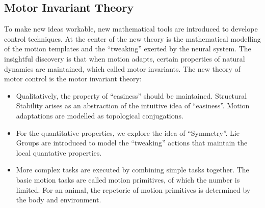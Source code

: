 \subsection{Motor Invariant Theory}
%
%
%
To make new ideas workable, new mathematical tools are introduced to develope control techniques.
At the center of the new theory is the mathematical modelling of the motion templates and the ``tweaking'' exerted by the neural system.
The insightful discovery is that when motion adapts, certain properties of natural dynamics are maintained, which called motor invariants.
The new theory of motor control is the motor invariant theory:
\begin{itemize}

\item Qualitatively, the property of ``easiness'' should be maintained.
Structural Stability arises as an abstraction of the intuitive idea of ``easiness''.
Motion adaptations are modelled as topological conjugations. 

\item For the quantitative properties, we explore the idea of ``Symmetry''.
Lie Groups are introduced to model the ``tweaking'' actions that maintain the local quantative properties.


\item More complex tasks are executed by combining simple tasks together.
The basic motion tasks are called motion primitives, of which the number is limited.
For an animal, the repetorie of motion primitives is determined by the body and environment.
\end{itemize}

